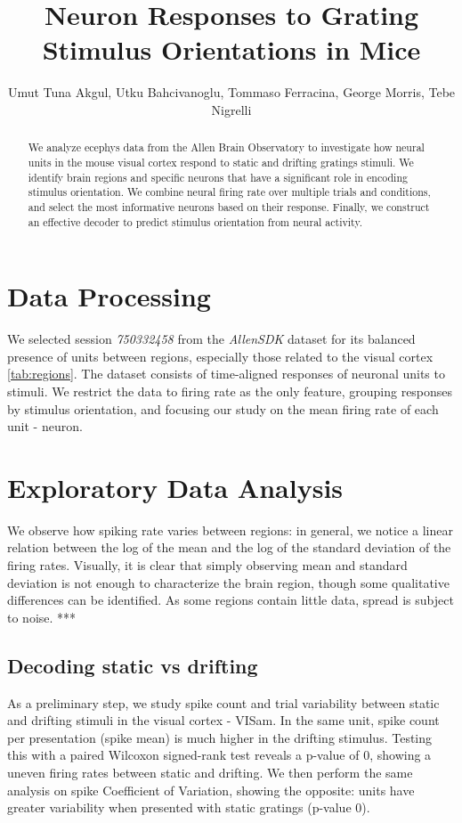 \documentclass[10pt,twocolumn]{article}
\title{\Large \textbf{Neuron Responses to Grating Stimulus Orientations in Mice}}
\author{
  Umut Tuna Akgul, Utku Bahcivanoglu, Tommaso Ferracina, George Morris, Tebe Nigrelli
}
\begin{document}
\maketitle

\begin{abstract}
We analyze ecephys data from the Allen Brain Observatory to investigate how neural units in the mouse visual cortex respond to static and drifting gratings stimuli. We identify brain regions and specific neurons that have a significant role in encoding stimulus orientation. We combine neural firing rate over multiple trials and conditions, and select the most informative neurons based on their response. Finally, we construct an  effective decoder to predict stimulus orientation from neural activity.
\end{abstract}


\section{Data Processing}

We selected session \textit{750332458} from the \textit{AllenSDK} dataset for its balanced presence of units between regions, especially those related to the visual cortex \ref{tab:regions}. The dataset consists of time-aligned responses of neuronal units to stimuli. We restrict the data to firing rate as the only feature, grouping responses by stimulus orientation, and focusing our study on the mean firing rate of each unit - neuron.

\section{Exploratory Data Analysis}

We observe how spiking rate varies between regions: in general, we notice a linear relation between the log of the mean and the log of the standard deviation of the firing rates. Visually, it is clear that simply observing mean and standard deviation is not enough to characterize the brain region, though some qualitative differences can be identified. As some regions contain little data, spread is subject to noise. ***

\subsection{Decoding static vs drifting}

As a preliminary step, we study spike count and trial variability between static and drifting stimuli in the visual cortex - VISam. In the same unit, spike count per presentation (spike mean) is much higher in the drifting stimulus. Testing this with a paired Wilcoxon signed-rank test reveals a p-value of 0, showing a uneven firing rates between static and drifting. We then perform the same analysis on spike Coefficient of Variation, showing the opposite: units have greater variability when presented with static gratings (p-value 0).
\end{document}
